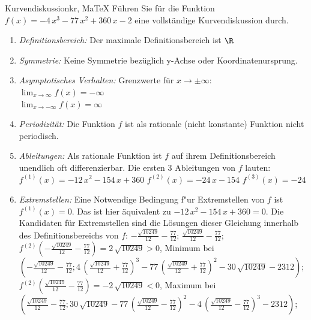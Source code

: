  \providecommand{\MoIl}{(} 
 \providecommand{\MoIr}{)}
 \providecommand{\MIntvlSep}{;} 
 \providecommand{\MElSetSep}{;} 
 \begin{MAufgabe}{Kurvendiskussion}{kr, MaTeX}
 F\"uhren Sie f\"ur die Funktion $f(x)= - 4\, x^3 - 77\, x^2 + 360\, x - 2$ eine vollst\"andige Kurvendiskussion durch.\\ 
 \ifLsg\Loesung
 \begin{enumerate}
 \item \emph{Definitionsbereich:} 
 Der maximale Definitionsbereich ist $\R$\item \emph{Symmetrie:} 
 Keine Symmetrie bez\"uglich y-Achse oder Koordinatenursprung.\item \emph{Asymptotisches Verhalten:} 
 Grenzwerte f\"ur $x\rightarrow \pm \infty$: \\ 
 $\lim_{x\rightarrow \infty} f(x)=- \infty$ \\ 
 $\lim_{x\rightarrow -\infty} f(x)=\infty$ \\ 
 \item \emph{Periodizit\"at:} 
 Die Funktion $f$ ist als rationale (nicht konstante) Funktion nicht periodisch.\item \emph{Ableitungen:} 
 Als rationale Funktion ist $f$ auf ihrem Definitionsbereich unendlich oft differenzierbar. 
 Die ersten 3 Ableitungen von $f$ lauten: \\ 
 $f^{(1)}(x)= - 12\, x^2 - 154\, x + 360$\newline 
  $f^{(2)}(x)= - 24\, x - 154$\newline 
  $f^{(3)}(x)=-24$\newline 
  \item \emph{Extremstellen:} 
 Eine Notwendige Bedingung f"ur Extremstellen von $f$ ist $f^{(1)}(x)=0$. 
 Das ist hier \"aquivalent zu $ - 12\, x^2 - 154\, x + 360=0$. 
 Die Kandidaten f\"ur Extremstellen sind die L\"osungen dieser Gleichung innerhalb des Definitionsbereichs von $f$: $ - \frac{\sqrt{10249}}{12} - \frac{77}{12}$; $\frac{\sqrt{10249}}{12} - \frac{77}{12}$; \\ 
 $f^{(2)}( - \frac{\sqrt{10249}}{12} - \frac{77}{12})=2\, \sqrt{10249}$$>0$, Minimum bei $( - \frac{\sqrt{10249}}{12} - \frac{77}{12};4\, {\left(\frac{\sqrt{10249}}{12} + \frac{77}{12}\right)}^3 - 77\, {\left(\frac{\sqrt{10249}}{12} + \frac{77}{12}\right)}^2 - 30\, \sqrt{10249} - 2312)$; \\ 
 $f^{(2)}(\frac{\sqrt{10249}}{12} - \frac{77}{12})=- 2\, \sqrt{10249}$$<0$, Maximum bei $(\frac{\sqrt{10249}}{12} - \frac{77}{12};30\, \sqrt{10249} - 77\, {\left(\frac{\sqrt{10249}}{12} - \frac{77}{12}\right)}^2 - 4\, {\left(\frac{\sqrt{10249}}{12} - \frac{77}{12}\right)}^3 - 2312)$; \\ 

\end{enumerate}
\end{MAufgabe}

